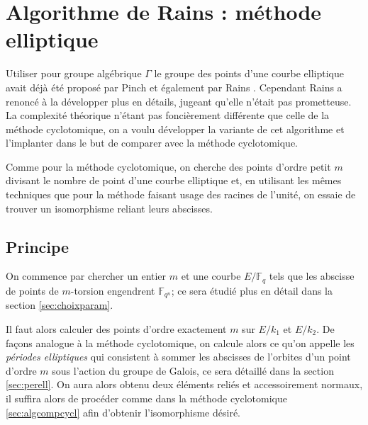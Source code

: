\documentclass[a4paper]{article} %
\numberwithin{section}{part}
\numberwithin{equation}{section}
\newcommand\GF[1]{\mathbb{F}_{#1}}
\begin{document}
\section{Algorithme de Rains : méthode elliptique}
\label{sec:algell}
Utiliser pour groupe algébrique $\Gamma$ le groupe des points d'une courbe
elliptique avait déjà été proposé par Pinch \cite{Pin} et également par Rains
\cite{Rai}. Cependant Rains a renoncé à la développer plus en détails, jugeant
qu'elle n'était pas prometteuse. La complexité théorique n'étant pas
foncièrement différente que celle de la méthode cyclotomique, on a voulu
développer la variante de cet algorithme et l'implanter dans le but de comparer
avec la méthode cyclotomique.\par
Comme pour la méthode cyclotomique, on cherche des points d'ordre petit $m$ 
divisant le nombre de point d'une courbe elliptique et, en utilisant les mêmes 
techniques que pour la méthode faisant usage des racines de l'unité, on essaie 
de trouver un isomorphisme reliant leurs abscisses.
\subsection{Principe}
On commence par chercher un entier $m$ et une courbe $E/\GF{q}$ tels que
les abscisse de points de $m$-torsion engendrent $\GF{q^n}$; ce sera
étudié plus en détail dans la section \ref{sec:choixparam}.\par
Il faut alors calculer des points d'ordre exactement $m$ sur $E/k_1$ et $E/k_2$.
De façons analogue à la méthode cyclotomique, on calcule alors ce qu'on appelle 
les \emph{périodes elliptiques} qui consistent à sommer les abscisses de 
l'orbites d'un point d'ordre $m$ sous l'action du groupe de Galois, ce sera 
détaillé dans la section \ref{sec:perell}. On aura alors obtenu deux éléments 
reliés et accessoirement normaux, il suffira alors de procéder comme dans la 
méthode cyclotomique \ref{sec:algcompcycl} afin d'obtenir l'isomorphisme désiré.
\end{document}
